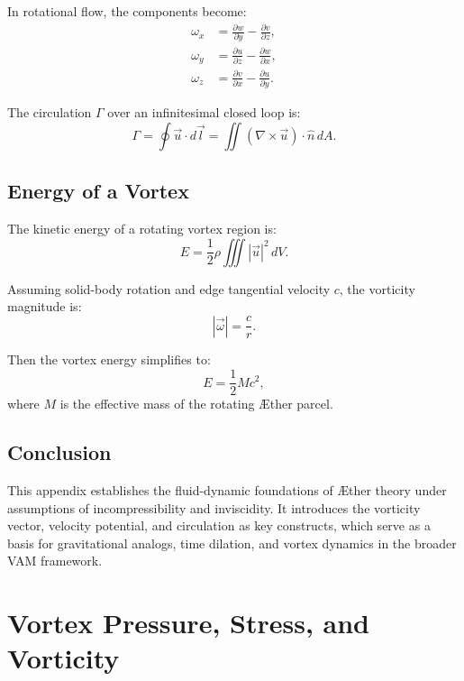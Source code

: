 \documentclass[a4paper,12pt]{article}
\begin{document}
    In rotational flow, the components become:
    \begin{align}
        \omega_x &= \frac{\partial w}{\partial y} - \frac{\partial v}{\partial z}, \\
        \omega_y &= \frac{\partial u}{\partial z} - \frac{\partial w}{\partial x}, \\
        \omega_z &= \frac{\partial v}{\partial x} - \frac{\partial u}{\partial y}.
    \end{align}

    The circulation \(\Gamma\) over an infinitesimal closed loop is:
    \begin{equation}
        \Gamma = \oint \vec{u} \cdot d\vec{l} = \iint (\nabla \times \vec{u}) \cdot \hat{n} \, dA.
    \end{equation}

    \subsection{Energy of a Vortex}
    The kinetic energy of a rotating vortex region is:
    \begin{equation}
        E = \frac{1}{2} \rho \iiint |\vec{u}|^2 \, dV.
    \end{equation}

    Assuming solid-body rotation and edge tangential velocity \(c\), the vorticity magnitude is:
    \begin{equation}
        |\vec{\omega}| = \frac{c}{r}.
    \end{equation}

    Then the vortex energy simplifies to:
    \begin{equation}
        E = \frac{1}{2} M c^2,
    \end{equation}
    where \(M\) is the effective mass of the rotating Æther parcel.

    \subsection*{Conclusion}
    This appendix establishes the fluid-dynamic foundations of Æther theory under assumptions of incompressibility and inviscidity. It introduces the vorticity vector, velocity potential, and circulation as key constructs, which serve as a basis for gravitational analogs, time dilation, and vortex dynamics in the broader VAM framework.

        \section{Vortex Pressure, Stress, and Vorticity}
\end{document}
